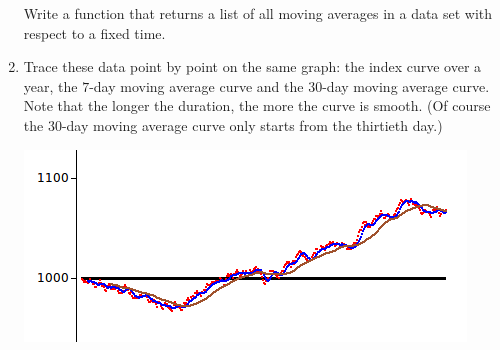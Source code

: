 \documentclass[11pt,class=report,crop=false]{standalone}
\begin{document}
\begin{activite}
\begin{enumerate}
   Write a  function that returns a list of all moving averages in a data set with respect to a fixed time.
   
    \item Trace these data point by point on the same graph: the index curve over a year, the $7$-day moving average curve and the $30$-day moving average curve. Note that the longer the duration, the more the curve is \og{}smooth\fg{}. (Of course the $30$-day moving average curve only starts from the thirtieth day.)
   
\begin{center}
\includegraphics[scale=\myscale,scale=0.8]{screen-stat-5b}
\end{center}

\end{enumerate}

\end{activite}
\end{document}
